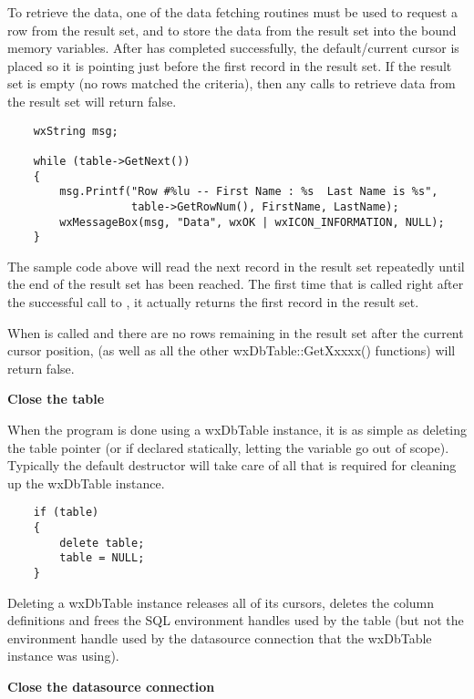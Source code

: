 To retrieve the data, one of the data fetching routines must be used to 
request a row from the result set, and to store the data from the result 
set into the bound memory variables. After  
has completed successfully, the default/current cursor is placed so it 
is pointing just before the first record in the result set. If the 
result set is empty (no rows matched the criteria), then any calls to 
retrieve data from the result set will return false.

\begin{verbatim}
    wxString msg;

    while (table->GetNext())
    {
        msg.Printf("Row #%lu -- First Name : %s  Last Name is %s",
      	           table->GetRowNum(), FirstName, LastName);
        wxMessageBox(msg, "Data", wxOK | wxICON_INFORMATION, NULL);
    }
\end{verbatim}

The sample code above will read the next record in the result set repeatedly 
until the end of the result set has been reached. The first time that 
 is called right after the successful 
call to , it actually returns the first record 
in the result set. 

When  is called and there are 
no rows remaining in the result set after the current cursor position, 
 (as well as all the other 
wxDbTable::GetXxxxx() functions) will return false.

{\bf Close the table}

When the program is done using a wxDbTable instance, it is as simple as 
deleting the table pointer (or if declared statically, letting the 
variable go out of scope). Typically the default destructor will take 
care of all that is required for cleaning up the wxDbTable instance.

\begin{verbatim}
    if (table)
    {
        delete table;
        table = NULL;
    }
\end{verbatim}

Deleting a wxDbTable instance releases all of its cursors, deletes the 
column definitions and frees the SQL environment handles used by the 
table (but not the environment handle used by the datasource connection 
that the wxDbTable instance was using).

{\bf Close the datasource connection}

